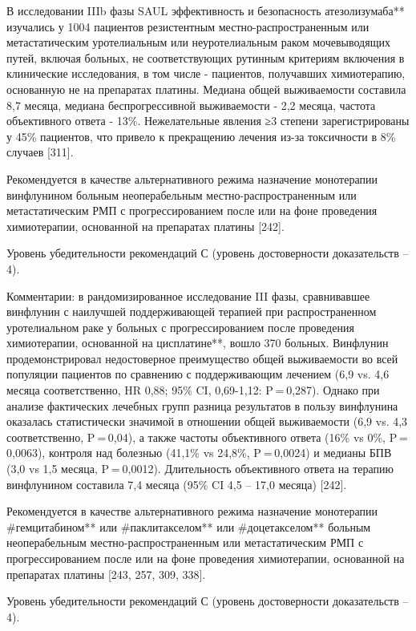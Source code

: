 В исследовании IIIb фазы SAUL эффективность и безопасность атезолизумаба** изучались у 1004 пациентов резистентным местно-распространенным или метастатическим уротелиальным или неуротелиальным раком мочевыводящих путей, включая больных, не соответствующих рутинным критериям включения в клинические исследования, в том числе - пациентов, получавших химиотерапию, основанную не на препаратах платины. Медиана общей выживаемости составила 8,7 месяца, медиана беспрогрессивной выживаемости - 2,2 месяца, частота объективного ответа - 13\%. Нежелательные явления ≥3 степени зарегистрированы у 45\% пациентов, что привело к прекращению лечения из-за токсичности в 8\% случаев [311].

Рекомендуется в качестве альтернативного режима назначение монотерапии винфлунином больным неоперабельным местно-распространенным или метастатическим РМП с прогрессированием после или на фоне проведения химиотерапии, основанной на препаратах платины [242].

Уровень убедительности рекомендаций С (уровень достоверности доказательств – 4).

Комментарии: в рандомизированное исследование III фазы, сравнивавшее винфлунин с наилучшей поддерживающей терапией при распространенном уротелиальном раке у больных с прогрессированием после проведения химиотерапии, основанной на цисплатине**, вошло 370 больных. Винфлунин продемонстрировал недостоверное преимущество общей выживаемости во всей популяции пациентов по сравнению с поддерживающим лечением (6,9 vs. 4,6 месяца соответственно, HR 0,88; 95\% CI, 0,69-1,12: P = 0,287). Однако при анализе фактических лечебных групп разница результатов в пользу винфлунина оказалась статистически значимой в отношении общей выживаемости (6,9 vs. 4,3 соответственно, P = 0,04), а также частоты объективного ответа (16\% vs 0\%, P = 0,0063), контроля над болезнью (41,1\% vs 24,8\%, P = 0,0024) и медианы БПВ (3,0 vs 1,5 месяца, P = 0,0012). Длительность объективного ответа на терапию винфлунином составила 7,4 месяца (95\% CI 4,5 – 17,0 месяца) [242].

Рекомендуется в качестве альтернативного режима назначение монотерапии #гемцитабином** или #паклитакселом** или #доцетакселом** больным неоперабельным местно-распространенным или метастатическим РМП с прогрессированием после или на фоне проведения химиотерапии, основанной на препаратах платины [243, 257, 309, 338].

Уровень убедительности рекомендаций С (уровень достоверности доказательств – 4).


